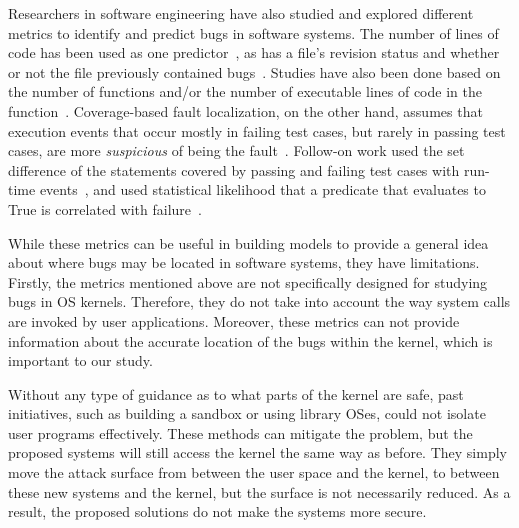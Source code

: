 Researchers in software engineering have also studied and explored 
different metrics to identify and predict bugs in software systems. 
The number of lines of code has been used as one 
predictor~\cite{Bug-Location}, as has a file's revision status and 
whether or not the file previously contained bugs~\cite{Bug-Location, 
lewis2013does}. Studies have also been done based on 
the number of functions and/or the number of executable lines of code in
the function~\cite{Mining-Metrics}. Coverage-based fault localization, 
on the other hand, assumes that execution events that occur mostly in failing
test cases, but rarely in passing test cases, are more \textit{suspicious} 
of being the fault~\cite{jones2002visualization}. Follow-on work used 
the set difference of the statements covered by passing and failing test 
cases with run-time events~\cite{agrawal1995fault, jones2005empirical}, 
and used statistical likelihood that a predicate that evaluates to True is 
correlated with failure~\cite{liblit2005scalable}. 

While these metrics can be useful in building models to provide a general
idea about 
where bugs may be located in software systems, they have limitations. 
Firstly, the metrics mentioned above are not specifically designed for
studying bugs in OS kernels. 
Therefore, they do not take into account the way system calls are invoked
by user applications. 
Moreover, these metrics can not provide information about the accurate
location of the bugs within the kernel, 
which is important to our study.

Without any type of guidance as to what parts of the kernel are safe, past
initiatives, 
such as building a sandbox or using library OSes, could not 
isolate user programs effectively.  
These methods can mitigate the problem, but the proposed systems will still
access the kernel the same way as before. 
They simply move the attack surface from between the user space and the
kernel, 
to between these new systems and the kernel, but the surface is not
necessarily reduced. 
As a result, the proposed solutions do not make the systems more secure. 

